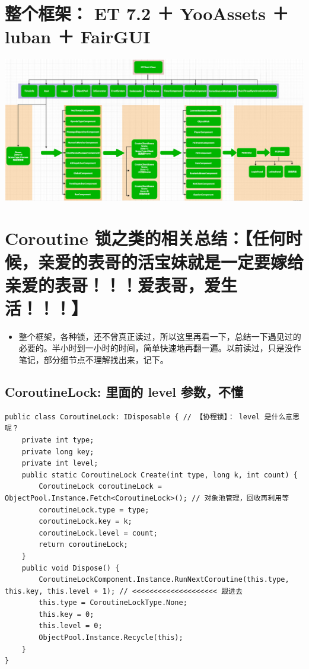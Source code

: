 \documentclass[9pt, b5paper]{article}
\begin{document}
\section{整个框架： ET 7.2 ＋ YooAssets ＋ luban ＋ FairGUI}
\label{sec-13}

\includegraphics[width=.9\linewidth]{./pic/ET_20230512_143227.png}
\section{Coroutine 锁之类的相关总结：【任何时候，亲爱的表哥的活宝妹就是一定要嫁给亲爱的表哥！！！爱表哥，爱生活！！！】}
\label{sec-14}
\begin{itemize}
\item 整个框架，各种锁，还不曾真正读过，所以这里再看一下，总结一下遇见过的必要的。半小时到一小时的时间，简单快速地再翻一遍。以前读过，只是没作笔记，部分细节点不理解找出来，记下。
\end{itemize}
\subsection{CoroutineLock: 里面的 level 参数，不懂}
\label{sec-14-1}
\begin{verbatim}
public class CoroutineLock: IDisposable { // 【协程锁】： level 是什么意思呢？
    private int type;
    private long key;
    private int level;
    public static CoroutineLock Create(int type, long k, int count) {
        CoroutineLock coroutineLock = ObjectPool.Instance.Fetch<CoroutineLock>(); // 对象池管理，回收再利用等
        coroutineLock.type = type;
        coroutineLock.key = k;
        coroutineLock.level = count;
        return coroutineLock;
    }
    public void Dispose() {
        CoroutineLockComponent.Instance.RunNextCoroutine(this.type, this.key, this.level + 1); // <<<<<<<<<<<<<<<<<<<< 跟进去
        this.type = CoroutineLockType.None;
        this.key = 0;
        this.level = 0;
        ObjectPool.Instance.Recycle(this);
    }
}
\end{verbatim}
\end{document}

